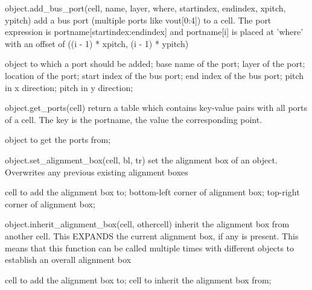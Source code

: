 \begin{APIfunc}{object.add\_bus\_port(cell, name, layer, where, startindex, endindex, xpitch, ypitch)}
    add a bus port (multiple ports like vout[0:4]) to a cell. The port expression is portname[startindex:endindex] and portname[i] is placed at 'where' with an offset of ((i - 1) * xpitch, (i - 1) * ypitch)
    \begin{APIparameters}
            object to which a port should be added;
            base name of the port;
            layer of the port;
            location of the port;
            start index of the bus port;
            end index of the bus port;
            pitch in x direction;
            pitch in y direction;
    \end{APIparameters}
\end{APIfunc}
\begin{APIfunc}{object.get\_ports(cell)}
    return a table which contains key-value pairs with all ports of a cell. The key is the portname, the value the corresponding point.
    \begin{APIparameters}
            object to get the ports from;
    \end{APIparameters}
\end{APIfunc}
\begin{APIfunc}{object.set\_alignment\_box(cell, bl, tr)}
    set the alignment box of an object. Overwrites any previous existing alignment boxes
    \begin{APIparameters}
            cell to add the alignment box to;
            bottom-left corner of alignment box;
            top-right corner of alignment box;
    \end{APIparameters}
\end{APIfunc}
\begin{APIfunc}{object.inherit\_alignment\_box(cell, othercell)}
    inherit the alignment box from another cell. This EXPANDS the current alignment box, if any is present. This means that this function can be called multiple times with different objects to establish an overall alignment box
    \begin{APIparameters}
            cell to add the alignment box to;
            cell to inherit the alignment box from;
    \end{APIparameters}
\end{APIfunc}
